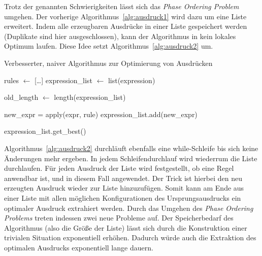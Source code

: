 \noindent Trotz der genannten Schwierigkeiten lässt sich das \textit{Phase Ordering Problem} umgehen. Der vorherige Algorithmus~\ref{alg:ausdruck1} wird dazu um eine Liste erweitert.
Indem alle erzeugbaren Ausdrücke in einer Liste gespeichert werden (Duplikate sind hier ausgeschlossen), kann der Algorithmus in kein lokales Optimum laufen.
Diese Idee setzt Algorithmus~\ref{alg:ausdruck2} um.



\begin{algorithm}[H]
  \caption{Verbesserter, naiver Algorithmus zur Optimierung von Ausdrücken}\label{alg:ausdruck2}
  \begin{algorithmic}
    \State rules $\gets$ [\ldots]
    \State expression\_list $\gets$ list(expression)
    
      \State old\_length $\gets$ length(expression\_list)

          \State new\_expr = apply(expr, rule)
          \State expression\_list.add(new\_expr)
          \EndIf
        \EndFor
      \EndFor
    \EndWhile

    \State \Return expression\_list.get\_best()
    \EndFunction
  \end{algorithmic}
\end{algorithm}

Algorithmus~\ref{alg:ausdruck2} durchläuft ebenfalls eine while-Schleife bis sich keine Änderungen mehr ergeben. In jedem Schleifendurchlauf wird wiederrum die Liste durchlaufen.
Für jeden Ausdruck der Liste wird festgestellt, ob eine Regel anwendbar ist, und in diesem Fall angewendet. Der Trick ist hierbei den neu erzeugten Ausdruck wieder zur Liste 
hinzuzufügen. Somit kann am Ende aus einer Liste mit allen möglichen Konfigurationen des Ursprungsausdrucks ein optimaler Ausdruck extrahiert werden.
Durch das Umgehen des \textit{Phase Ordering Problems} treten indessen zwei neue Probleme auf.
Der Speicherbedarf des Algorithmus (also die Größe der Liste) lässt sich durch die Konstruktion einer trivialen Situation exponentiell erhöhen.
Dadurch würde auch die Extraktion des optimalen Ausdrucks exponentiell lange dauern.

